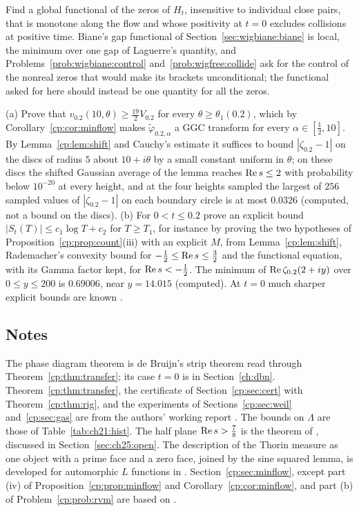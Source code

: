 \begin{problem}\label{cp:prob:gas}
Find a global functional of the zeros of $H_t$, insensitive to individual close pairs, that is monotone along the flow and whose positivity at $t=0$ excludes collisions at positive time. Biane's gap functional of Section~\ref{sec:wigbiane:biane} is local, the minimum over one gap of Laguerre's quantity, and Problems~\ref{prob:wigbiane:control} and~\ref{prob:wigfree:collide} ask for the control of the nonreal zeros that would make its brackets unconditional; the functional asked for here should instead be one quantity for all the zeros.
\end{problem}

\begin{problem}\label{cp:prob:rvm}
(a) Prove that $v_{0.2}(10,\theta)\ge\frac{19}2V_{0.2}$ for every $\theta\ge\theta_1(0.2)$, which by Corollary~\ref{cp:cor:minflow} makes $\tilde\varphi_{0.2,\alpha}$ a GGC transform for every $\alpha\in[\frac12,10]$. By Lemma~\ref{cp:lem:shift} and Cauchy's estimate it suffices to bound $|\zeta_{0.2}-1|$ on the discs of radius $5$ about $10+i\theta$ by a small constant uniform in $\theta$; on these discs the shifted Gaussian average of the lemma reaches $\operatorname{Re} s\le2$ with probability below $10^{-20}$ at every height, and at the four heights sampled the largest of $256$ sampled values of $|\zeta_{0.2}-1|$ on each boundary circle is at most $0.0326$ (computed, not a bound on the discs). (b) For $0<t\le0.2$ prove an explicit bound $|S_t(T)|\le c_1\log T+c_2$ for $T\ge T_1$, for instance by proving the two hypotheses of Proposition~\ref{cp:prop:count}(iii) with an explicit $M$, from Lemma~\ref{cp:lem:shift}, Rademacher's convexity bound for $-\frac12\le\operatorname{Re} s\le\frac32$ \cite{Rademacher59} and the functional equation, with its Gamma factor kept, for $\operatorname{Re} s<-\frac12$. The minimum of $\operatorname{Re}\zeta_{0.2}(2+iy)$ over $0\le y\le200$ is $0.69006$, near $y=14.015$ (computed). At $t=0$ much sharper explicit bounds are known \cite{HSW22}.
\end{problem}

\subsection*{Notes}

The phase diagram theorem is de Bruijn's strip theorem \cite[Theorem 13]{deBruijn} read through Theorem~\ref{cp:thm:transfer}; its case $t=0$ is in Section~\ref{ch:dbn}. Theorem~\ref{cp:thm:transfer}, the certificate of Section~\ref{cp:sec:cert} with Theorem~\ref{cp:thm:rig}, and the experiments of Sections~\ref{cp:sec:weil} and~\ref{cp:sec:gas} are from the authors' working report \cite{FA26}. The bounds on $\Lambda$ are those of Table~\ref{tab:ch21:hist}. The half plane $\operatorname{Re} s>\frac78$ is the theorem of \cite{OAI26a}, discussed in Section~\ref{sec:ch25:open}. The description of the Thorin measure as one object with a prime face and a zero face, joined by the sine squared lemma, is developed for automorphic $L$ functions in \cite{LG26}. Section~\ref{cp:sec:minflow}, except part (iv) of Proposition~\ref{cp:prop:minflow} and Corollary~\ref{cp:cor:minflow}, and part (b) of Problem~\ref{cp:prob:rvm} are based on \cite{P26heat}.
